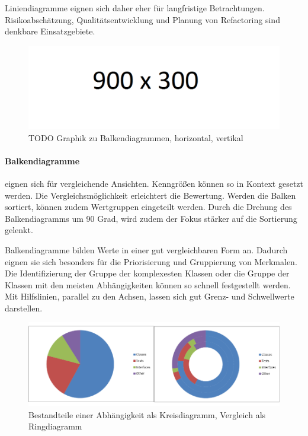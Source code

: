 Liniendiagramme eignen sich daher eher für langfristige Betrachtungen. Risikoabschätzung, Qualitätsentwicklung und Planung von Refactoring sind denkbare Einsatzgebiete.

\begin{figure}[htbp]
  \includegraphics[width=\textwidth, height=\textheight, keepaspectratio]
    {resources/900x300.pdf}
  \caption{TODO Graphik zu Balkendiagrammen, horizontal, vertikal}
  \label{bar-chart}
\end{figure}
\paragraph{Balkendiagramme} eignen sich für vergleichende Ansichten. Kenngrößen können so in Kontext gesetzt werden. Die Vergleichsmöglichkeit erleichtert die Bewertung. Werden die Balken sortiert, können zudem Wertgruppen eingeteilt werden. Durch die Drehung des Balkendiagramms um 90 Grad, wird zudem der Fokus stärker auf die Sortierung gelenkt.

Balkendiagramme bilden Werte in einer gut vergleichbaren Form an. Dadurch eignen sie sich besonders für die Priorisierung und Gruppierung von Merkmalen.
Die Identifizierung der Gruppe der komplexesten Klassen oder die Gruppe der Klassen mit den meisten Abhängigkeiten können so schnell festgestellt werden. Mit Hilfslinien, parallel zu den Achsen, lassen sich gut Grenz- und Schwellwerte darstellen.

\begin{figure}[htbp]
  \includegraphics[width=\textwidth, height=\textheight, keepaspectratio]
    {resources/circle-graph.pdf}
  \caption{Bestandteile einer Abhängigkeit als Kreisdiagramm, Vergleich als Ringdiagramm}
  \label{circle-chart}
\end{figure}
